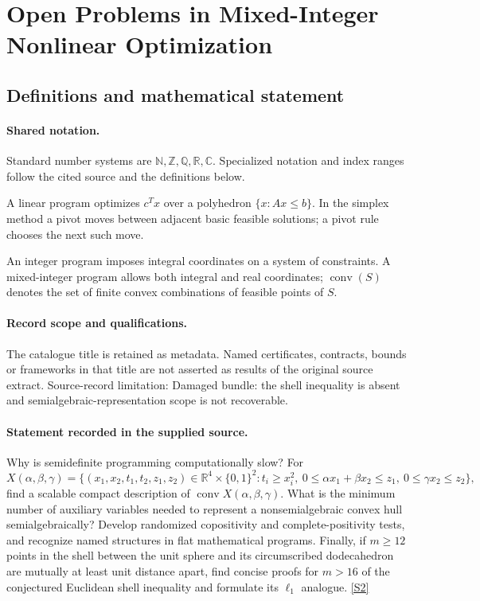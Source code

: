 \documentclass[11pt]{article}
\newcommand{\sref}[2]{\hyperlink{source:#1:#2}{[S#2]}}
\begin{document}
\section{Open Problems in Mixed-Integer Nonlinear Optimization}\label{statement}

\subsection{Definitions and mathematical statement}

\paragraph{Shared notation.}Standard number systems are $\mathbb N,\mathbb Z,\mathbb Q,\mathbb R,\mathbb C$. Specialized notation and index ranges follow the cited source and the definitions below.


A linear program optimizes $c^Tx$ over a polyhedron $\{x:Ax\leq b\}$. In the simplex method a pivot moves between adjacent basic feasible solutions; a pivot rule chooses the next such move.

An integer program imposes integral coordinates on a system of constraints. A mixed-integer program allows both integral and real coordinates; $\operatorname{conv}(S)$ denotes the set of finite convex combinations of feasible points of $S$.
\paragraph{Record scope and qualifications.}
The catalogue title is retained as metadata. Named certificates, contracts, bounds or frameworks in that title are not asserted as results of the original source extract.
Source-record limitation: Damaged bundle: the shell inequality is absent and semialgebraic-representation scope is not recoverable.
\paragraph{Statement recorded in the supplied source.}
Why is semidefinite programming computationally slow? For
$$X(\alpha,\beta,\gamma)=\{(x_1,x_2,t_1,t_2,z_1,z_2)\in\mathbb R^4\times\{0,1\}^2:t_i\geq x_i^2,\ 0\leq\alpha x_1+\beta x_2\leq z_1,\ 0\leq\gamma x_2\leq z_2\},$$
find a scalable compact description of $\operatorname{conv}X(\alpha,\beta,\gamma)$. What is the minimum number of auxiliary variables needed to represent a nonsemialgebraic convex hull semialgebraically? Develop randomized copositivity and complete-positivity tests, and recognize named structures in flat mathematical programs. Finally, if $m\geq12$ points in the shell between the unit sphere and its circumscribed dodecahedron are mutually at least unit distance apart, find concise proofs for $m>16$ of the conjectured Euclidean shell inequality and formulate its $\ell_1$ analogue. \sref{statement}{2}
\end{document}
